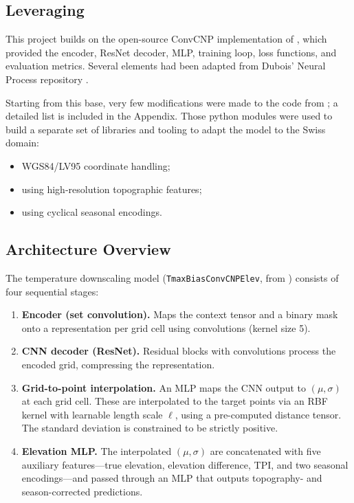 \subsection[Leveraging Vaughan et al. (2022)]{Leveraging \citet{vaughan2022}}

This project builds on the open-source ConvCNP implementation of \citet{vaughan2022} \citep{vaughan2022code}, which provided the encoder, ResNet decoder, MLP, training loop, loss functions, and evaluation metrics. Several elements had been adapted from Dubois' Neural Process repository \citep{dubois2020npf}.

Starting from this base, very few modifications were made to the code from \citet{vaughan2022}; a detailed list is included in the Appendix. Those python modules were used to build a separate set of libraries and tooling to adapt the model to the Swiss domain:

\begin{itemize}
    \item WGS84/LV95 coordinate handling;
    \item using high-resolution topographic features;
    \item using cyclical seasonal encodings.
\end{itemize}

\subsection{Architecture Overview}
\label{sec:architecture_overview}

The temperature downscaling model (\texttt{TmaxBiasConvCNPElev}, from \citet{vaughan2022}) consists of four sequential stages:

\begin{enumerate}
    \item \textbf{Encoder (set convolution).} Maps the context tensor and a binary mask onto a representation per grid cell using convolutions (kernel size 5).

    \item \textbf{CNN decoder (ResNet).} Residual blocks with convolutions process the encoded grid, compressing the representation.

    \item \textbf{Grid-to-point interpolation.} An MLP maps the CNN output to $(\mu, \sigma)$ at each grid cell. These are interpolated to the target points via an RBF kernel with learnable length scale $\ell$, using a pre-computed distance tensor. The standard deviation is constrained to be strictly positive.

    \item \textbf{Elevation MLP.} The interpolated $(\mu, \sigma)$ are concatenated with five auxiliary features---true elevation, elevation difference, TPI, and two seasonal encodings---and passed through an MLP that outputs topography- and season-corrected predictions.
\end{enumerate}

